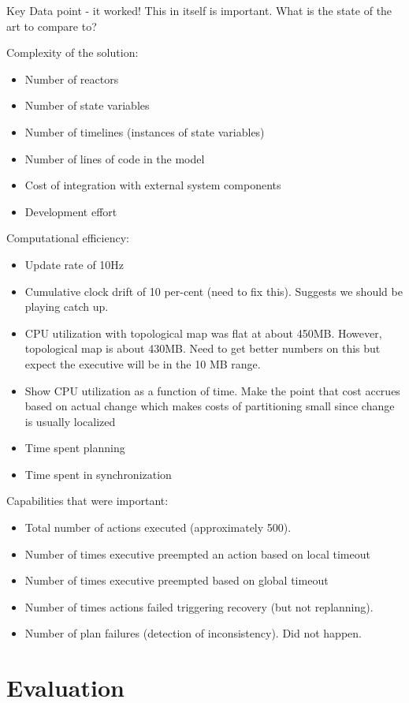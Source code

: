 \documentclass[letterpaper]{article}
\begin{document}
Key Data point - it worked! This in itself is important. What is the state of the art to compare to?

Complexity of the solution:
\begin{itemize}
\item Number of reactors
\item Number of state variables
\item Number of timelines (instances of state variables)
\item Number of lines of code in the model
\item Cost of integration with external system components
\item Development effort
\end{itemize}

Computational efficiency:
\begin{itemize}
\item Update rate of 10Hz
\item Cumulative clock drift of 10 per-cent (need to fix this). Suggests we should be playing catch up.
\item CPU utilization with topological map was flat at about 450MB. However, topological map is about 430MB. Need to get better numbers on this but expect the executive will be in the 10 MB range.
\item Show CPU utilization as a function of time. Make the point that cost accrues based on actual change which makes costs of partitioning small since change is usually localized
\item Time spent planning
\item Time spent in synchronization
\end{itemize}

Capabilities that were important:
\begin{itemize}
\item Total number of actions executed (approximately 500).
\item Number of times executive preempted an action based on local timeout
\item Number of times executive preempted based on global timeout
\item Number of times actions failed triggering recovery (but not replanning).
\item Number of plan failures (detection of inconsistency). Did not happen.
\end{itemize}

\section{Evaluation}
\end{document}
